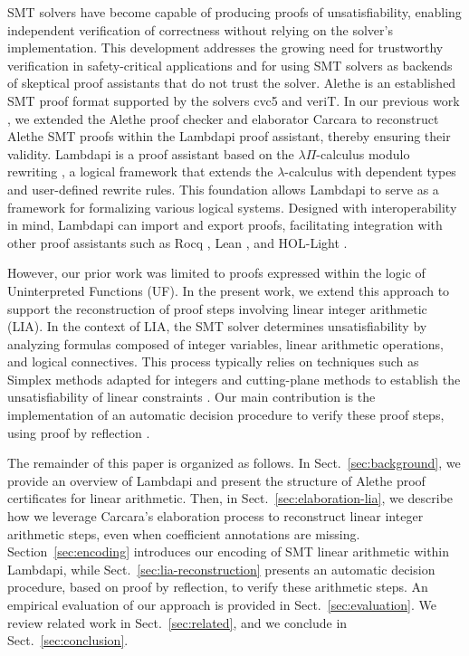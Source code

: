 \documentclass[runningheads,envcountsame]{llncs}
\begin{document}
SMT solvers have become capable of producing proofs of unsatisfiability,  enabling independent verification of correctness without relying on the solver's implementation.
This development addresses the growing need for trustworthy verification in safety-critical applications and for using SMT solvers as backends of skeptical proof assistants that do not trust the solver.
Alethe \cite{alethe,alethespec} is an established SMT proof format supported by the solvers cvc5 and veriT. In our previous work \cite{ColtellacciMD24}, we extended the Alethe proof checker and elaborator Carcara \cite{carcara} to
reconstruct Alethe SMT proofs within the Lambdapi proof assistant, thereby ensuring their validity.
Lambdapi \cite{lambdapi} is a proof assistant based on the $\lambda\Pi$-calculus modulo rewriting \cite{lpmodulo}, a logical framework \cite{lf} that extends the $\lambda$-calculus with dependent types and user-defined rewrite rules.
This foundation allows Lambdapi to serve as a framework for formalizing various logical systems.
Designed with interoperability in mind, Lambdapi can import and export proofs, facilitating integration with other proof assistants such as Rocq \cite{Rocq-refman}, Lean \cite{lean4:2021}, and HOL-Light \cite{LPAR2024:Translating_HOL_Light_proofs}. 

However, our prior work was limited to proofs expressed within the logic of Uninterpreted Functions (UF).
In the present work, we extend this approach to support the reconstruction of proof steps involving linear integer arithmetic (LIA).
In the context of LIA, the SMT solver determines unsatisfiability by analyzing formulas composed of integer variables, linear arithmetic operations, and logical connectives.
This process typically relies on techniques such as Simplex methods adapted for integers and cutting-plane methods to establish the unsatisfiability of linear constraints \cite{SRI:simplex:dpllt,bromberger:lia}.
Our main contribution is the implementation of an automatic decision procedure to verify these proof steps, using proof by reflection \cite{reflection-origin-coq,ring-coq}.

The remainder of this paper is organized as follows.
In Sect.~\ref{sec:background}, we provide an overview of Lambdapi and present the structure of Alethe proof certificates for linear arithmetic.
Then, in Sect.~\ref{sec:elaboration-lia}, we describe how we leverage Carcara's elaboration process to reconstruct linear integer arithmetic steps, even when coefficient annotations are missing.
Section~\ref{sec:encoding} introduces our encoding of SMT linear arithmetic within Lambdapi, while Sect.~\ref{sec:lia-reconstruction} presents an automatic decision procedure, based on proof by reflection, to verify these arithmetic steps.
An empirical evaluation of our approach is provided in Sect.~\ref{sec:evaluation}. We review related work in Sect.~\ref{sec:related}, and we conclude in Sect.~\ref{sec:conclusion}.
\end{document}

